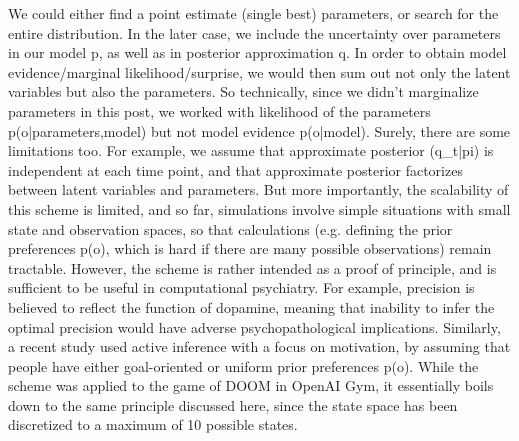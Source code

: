 \documentclass[12pt]{article}
\begin{document}
We could either find a point estimate (single best) parameters, or search for the entire distribution. In the later case, we include the uncertainty over parameters in our model p, as well as in posterior approximation q. In order to obtain model evidence/marginal likelihood/surprise, we would then sum out not only the latent variables but also the parameters. So technically, since we didn't marginalize parameters in this post, we worked with likelihood of the parameters p(o|parameters,model) but not model evidence p(o|model).
Surely, there are some limitations too. For example, we assume that approximate posterior (q\_t|pi) is independent at each time point, and that approximate posterior factorizes between latent variables and parameters. But more importantly, the scalability of this scheme is limited, and so far, simulations involve simple situations with small state and observation spaces, so that calculations (e.g. defining the prior preferences p(o), which is hard if there are many possible observations) remain tractable. However, the scheme is rather intended as a proof of principle, and is sufficient to be useful in computational psychiatry. For example, precision is believed to reflect the function of dopamine, meaning that inability to infer the optimal precision would have adverse psychopathological implications. Similarly, a recent study used active inference with a focus on motivation, by assuming that people have either goal-oriented or uniform prior preferences p(o). While the scheme was applied to the game of DOOM in OpenAI Gym, it essentially boils down to the same principle discussed here, since the state space has been discretized to a maximum of 10 possible states.
\end{document}
